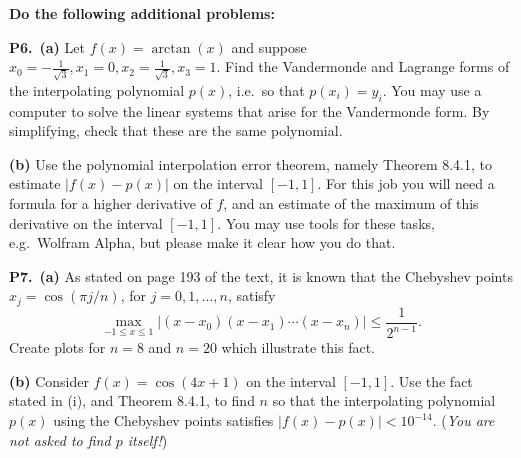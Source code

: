 \documentclass[12pt]{amsart}
\newcommand{\prob}[1]{\bigskip\noindent\textbf{#1.}\quad }
\newcommand{\epart}[1]{\medskip\noindent\textbf{(#1)}\quad }
\newcommand{\ppart}[1]{\,\textbf{(#1)}\quad }
\begin{document}
\bigskip
\noindent \textbf{Do the following additional problems:}

\prob{P6}  \ppart{a}  Let $f(x)=\arctan(x)$ and suppose $x_0=-\frac{1}{\sqrt{3}},x_1=0,x_2=\frac{1}{\sqrt{3}},x_3=1$.  Find the Vandermonde and Lagrange forms of the interpolating polynomial $p(x)$, i.e.~so that $p(x_i)=y_i$.  You may use a computer to solve the linear systems that arise for the Vandermonde form.  By simplifying, check that these are the same polynomial.

\epart{b}  Use the polynomial interpolation error theorem, namely Theorem 8.4.1, to estimate $|f(x)-p(x)|$ on the interval $[-1,1]$.  For this job you will need a formula for a higher derivative of $f$, and an estimate of the maximum of this derivative on the interval $[-1,1]$.  You may use tools for these tasks, e.g.~Wolfram Alpha, but please make it clear how you do that.

\prob{P7}  \ppart{a}  As stated on page 193 of the text, it is known that the Chebyshev points $x_j=\cos(\pi j/n)$, for $j=0,1,\dots,n$, satisfy
        $$\max_{-1\le x\le 1} \left|(x-x_0)(x-x_1)\cdots(x-x_n)\right| \le \frac{1}{2^{n-1}}.$$
    Create plots for $n=8$ and $n=20$ which illustrate this fact.
    
\epart{b}  Consider $f(x) = \cos(4x+1)$ on the interval $[-1,1]$.  Use the fact stated in (i), and Theorem 8.4.1, to find $n$ so that the interpolating polynomial $p(x)$ using the Chebyshev points satisfies $|f(x)-p(x)|<10^{-14}$.  (\emph{You are \emph{not} asked to find $p$ itself!})
\end{document}
